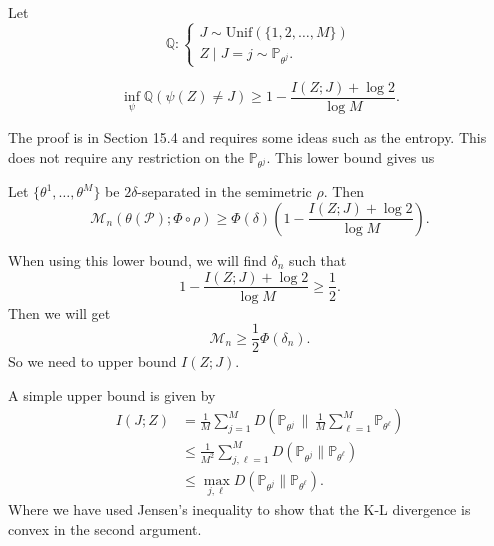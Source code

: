 Let
\begin{equation*}
    \mathbb{Q} : \begin{cases}
        J \sim \mathrm{Unif}(\{1, 2, \ldots, M\}) \\
        Z \mid J = j \sim \mathbb{P}_{\theta^j}.
    \end{cases}
\end{equation*}

\begin{lem}
    \begin{equation*}
        \inf_\psi \mathbb{Q}(\psi(Z) \neq J) \geq 1 - \frac{I(Z;J) + \log 2}{\log M}.
    \end{equation*}
\end{lem}

The proof is in Section 15.4 and requires some ideas such as the entropy. This does not require any restriction on the $\mathbb{P}_{\theta^j}$. This lower bound gives us

\begin{prop}
    Let $\{\theta^1, \ldots, \theta^M\}$ be $2\delta$-separated in the semimetric $\rho$. Then
    \begin{equation*}
        \mathcal{M}_n(\theta(\mathcal{P}); \Phi \circ \rho) \geq \Phi(\delta) \left( 1 - \frac{I(Z;J) + \log 2}{\log M} \right).
    \end{equation*}
\end{prop}

When using this lower bound, we will find $\delta_n$ such that
\begin{equation*}
    1 - \frac{I(Z;J) + \log 2}{\log M} \geq \frac{1}{2}.
\end{equation*}
Then we will get
\begin{equation*}
    \mathcal{M}_n \geq \frac{1}{2} \Phi(\delta_n).
\end{equation*}
So we need to upper bound $I(Z;J)$.

A simple upper bound is given by
\begin{align*}
    I(J;Z) &= \frac{1}{M} \sum_{j=1}^{M} D\!\left( \mathbb{P}_{\theta^j} \,\Big\|\, \frac{1}{M} \sum_{\ell=1}^{M} \mathbb{P}_{\theta^\ell} \right) \\
    &\leq \frac{1}{M^2} \sum_{j,\ell=1}^{M} D(\mathbb{P}_{\theta^j} \| \mathbb{P}_{\theta^\ell}) \\
    &\leq \max_{j,\ell} D(\mathbb{P}_{\theta^j} \| \mathbb{P}_{\theta^\ell}).
\end{align*}
Where we have used Jensen's inequality to show that the K-L divergence is convex in the second argument.

